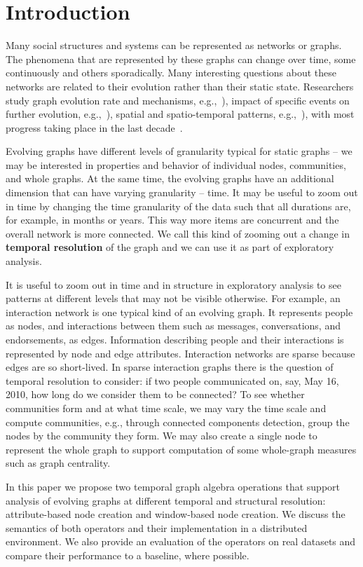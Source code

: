 \section{Introduction}
\label{sec:intro}

Many social structures and systems can be represented as networks or
graphs.  The phenomena that are represented by these graphs can change
over time, some continuously and others sporadically.  Many
interesting questions about these networks are related to their
evolution rather than their static state.  Researchers study graph
evolution rate and mechanisms,
e.g.,~\cite{DBLP:journals/csur/AggarwalS14,Cho2000}), impact of
specific events on further evolution, e.g.,~\cite{Chan2008}), spatial
and spatio-temporal patterns, e.g.,~\cite{Lahiri2008}), with most
progress taking place in the last
decade~\cite{Kan2009,Miao2015,Ren2011,Semertzidis2015}.

Evolving graphs have different levels of granularity typical for
static graphs -- we may be interested in properties and behavior of
individual nodes, communities, and whole graphs.  At the same time,
the evolving graphs have an additional dimension that can have varying
granularity -- time.  It may be useful to zoom out in time by changing
the time granularity of the data such that all durations are, for
example, in months or years.  This way more items are concurrent and
the overall network is more connected.  We call this kind of zooming
out a change in {\bf temporal resolution} of the graph and we can use
it as part of exploratory analysis.

It is useful to zoom out in time and in structure in exploratory
analysis to see patterns at different levels that may not be visible
otherwise.  For example, an interaction network is one typical kind of
an evolving graph.  It represents people as nodes, and interactions
between them such as messages, conversations, and endorsements, as
edges.  Information describing people and their interactions is
represented by node and edge attributes.  Interaction networks are
sparse because edges are so short-lived.  In sparse interaction graphs
there is the question of temporal resolution to consider: if two
people communicated on, say, May 16, 2010, how long do we consider
them to be connected?  To see whether communities form and at what
time scale, we may vary the time scale and compute communities, e.g.,
through connected components detection, group the nodes by the
community they form.  We may also create a single node to represent
the whole graph to support computation of some whole-graph measures
such as graph centrality.

In this paper we propose two temporal graph algebra operations that
support analysis of evolving graphs at different temporal and
structural resolution: attribute-based node creation and window-based
node creation.  We discuss the semantics of both operators and their
implementation in a distributed environment.  We also provide an
evaluation of the operators on real datasets and compare their
performance to a baseline, where possible.




